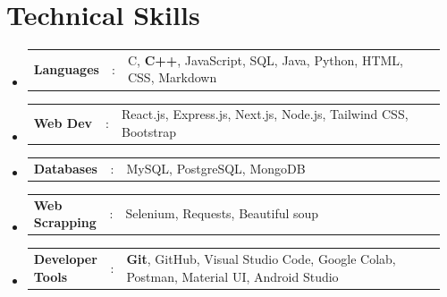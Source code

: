 \documentclass[letterpaper,11pt]{article}
\newcommand{\resumeSectionType}[3]{
  \item\begin{tabular*}{0.9\textwidth}[t]{
    p{0.17\linewidth}p{0.02\linewidth}p{0.77\linewidth}
  }
    \textbf{#1} & #2 & #3
  \end{tabular*}\vspace{-2pt}
}
\begin{document}

\section{Technical Skills}
\begin{itemize}
    \resumeSectionType{Languages}{:}{C, \textbf{C++}, JavaScript, SQL, Java, Python, HTML, CSS, Markdown}
    \resumeSectionType{Web Dev}{:}{React.js, Express.js, Next.js, Node.js, Tailwind CSS, Bootstrap}
    \resumeSectionType{Databases}{:}{MySQL, PostgreSQL, MongoDB}
    \resumeSectionType{Web Scrapping}{:}{Selenium, Requests, Beautiful soup}
    \resumeSectionType{Developer Tools}{:}{\textbf{Git}, GitHub, Visual Studio Code, Google Colab, Postman, Material UI, Android Studio}
\end{itemize}
\vspace{-13pt}

\end{document}
